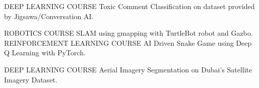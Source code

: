 

\begin{cventries}



  \cventry
    {DEEP LEARNING COURSE} %
    {Toxic Comment Classification on dataset provided by Jigsawa/Conversation AI.} %
    {} %
    {} %
    {
    }

  \cventry
    {ROBOTICS COURSE} %
    {SLAM using gmapping with TurtleBot robot and Gazbo.} %
    {} %
    {} %
    {
    }
  \cventry
    {REINFORCEMENT LEARNING COURSE} %
    {AI Driven Snake Game using Deep Q Learning with PyTorch.} %
    {} %
    {} %
    {
    }

\cventry
    {DEEP LEARNING COURSE} %
    {Aerial Imagery Segmentation on Dubai's Satellite Imagery Dataset.} %
    {} %
    {} %
    {
    }


\end{cventries}
